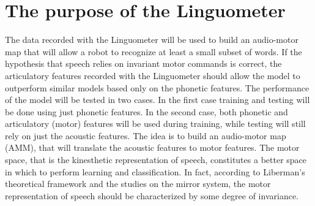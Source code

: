 \section{The purpose of the  Linguometer}

The data recorded with the Linguometer will be used to build an audio-motor map 
that will allow a robot to recognize at least a small subset of words.
If the hypothesis that speech relies on invariant motor commands is correct, 
the articulatory features recorded with the Linguometer should allow the
model to outperform similar models based only on the phonetic features.
The performance of the model will be tested in two cases.
In the first case training and testing will be done using just phonetic
features. In the second case, both phonetic and articulatory (motor) features
will be used during training, while testing will still rely on just the acoustic
features.
The idea is to build an audio-motor map (AMM), that will translate the acoustic 
features to motor features. 
The motor space, that is the kinesthetic representation of speech, constitutes
a better space in which to perform learning and classification.
In fact, according to Liberman's theoretical framework and the
studies on the mirror system, the motor representation of speech should be 
characterized by some degree of invariance.

